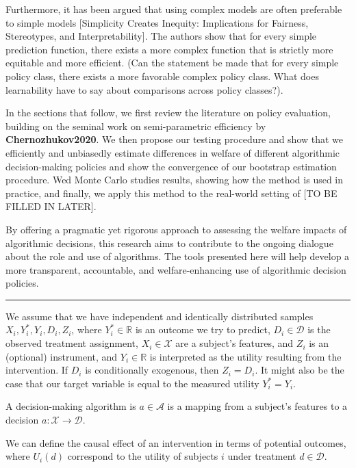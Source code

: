 \documentclass[
]{article}
\begin{document}
Furthermore, it has been argued that using complex models are often
preferable to simple models {[}Simplicity Creates Inequity: Implications
for Fairness, Stereotypes, and Interpretability{]}. The authors show
that for every simple prediction function, there exists a more complex
function that is strictly more equitable and more efficient. (Can the
statement be made that for every simple policy class, there exists a
more favorable complex policy class. What does learnability have to say
about comparisons across policy classes?).

In the sections that follow, we first review the literature on policy
evaluation, building on the seminal work on semi-parametric efficiency
by \textbf{Chernozhukov2020}. We then propose our testing procedure and
show that we efficiently and unbiasedly estimate differences in welfare
of different algorithmic decision-making policies and show the
convergence of our bootstrap estimation procedure. Wed Monte Carlo
studies results, showing how the method is used in practice, and
finally, we apply this method to the real-world setting of {[}TO BE
FILLED IN LATER{]}.

By offering a pragmatic yet rigorous approach to assessing the welfare
impacts of algorithmic decisions, this research aims to contribute to
the ongoing dialogue about the role and use of algorithms. The tools
presented here will help develop a more transparent, accountable, and
welfare-enhancing use of algorithmic decision policies.

\begin{center}\rule{0.5\linewidth}{0.5pt}\end{center}

We assume that we have independent and identically distributed samples
\(X_{i}, Y^*_{i}, Y_{i}, D_{i}, Z_{i}\), where
\(Y^*_{i} \in \mathbb{R}\) is an outcome we try to predict,
\(D_{i} \in \mathcal{D}\) is the observed treatment assignment,
\(X_{i} \in \mathcal{X}\) are a subject's features, and \(Z_{i}\) is an
(optional) instrument, and \(Y_{i}\in\mathbb{R}\) is interpreted as the
utility resulting from the intervention. If \(D_{i}\) is conditionally
exogenous, then \(Z_{i}=D_{i}\). It might also be the case that our
target variable is equal to the measured utility \(Y^*_{i} = Y_{i}\).

A decision-making algorithm is \(a \in \mathcal{A}\) is a mapping from a
subject's features to a decision \(a: \mathcal{X} \to \mathcal{D}\).

We can define the causal effect of an intervention in terms of potential
outcomes, where \(U_{i}(d)\) correspond to the utility of subjects \(i\)
under treatment \(d \in \mathcal{D}\).
\end{document}
